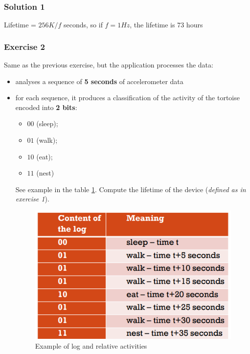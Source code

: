 \documentclass[10pt,a4paper]{report}
\theoremstyle{definition}
\begin{document}
\subsubsection{Solution 1}\label{sec:solution-1}
Lifetime = $256K/f$ seconds, so if $f = 1Hz$, the lifetime is $73$ hours


\subsubsection{Exercise 2}\label{sec:exercise-2}
Same as the previous exercise, but the application processes the data:
\begin{itemize}
	\item 
	analyses a sequence of \textbf{5 seconds} of accelerometer data
	\item 
	for each sequence, it produces a classification of the activity of the tortoise encoded into \textbf{2 bits}:
	\begin{itemize}
		\item 
		$00$ (sleep);
		\item 
		$01$ (walk);
		\item 
		$10$ (eat);
		\item 
		$11$ (nest)
		
	\end{itemize}
	See example in the table \ref{tortoise-ex2}. Compute the lifetime of the device (\textit{defined as in exercise 1}).
	\begin{figure}
		\centering\includegraphics[scale=0.50]{images/Pasted image 20230401160525.png}
		\caption{Example of log and relative activities}
		\label{tortoise-ex2}
	\end{figure}
	
\end{itemize}
\end{document}
